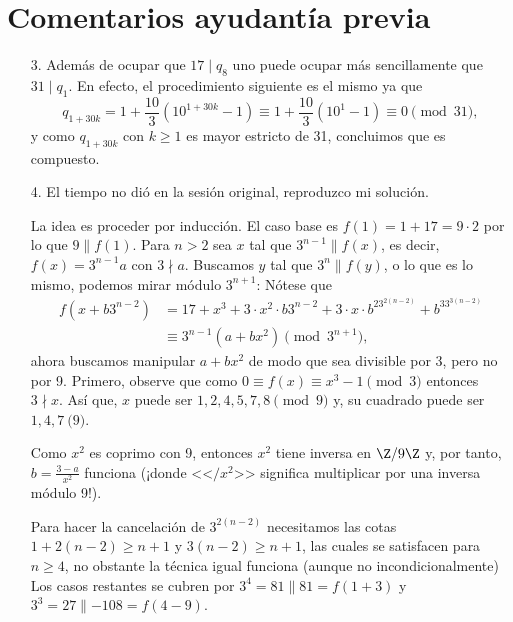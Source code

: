 \documentclass[11pt, reqno]{amsart}
\begin{document}
\section{Comentarios ayudantía previa}
\begin{enumerate}
	\item[3.] Además de ocupar que $17 \mid q_8$ uno puede ocupar más sencillamente que $31 \mid q_1$.
		En efecto, el procedimiento siguiente es el mismo ya que
		$$ q_{1 + 30k} = 1 + \frac{10}{3}(10^{1 + 30k} - 1) \equiv 1 + \frac{10}{3}(10^1 - 1) \equiv 0 \pmod{31}, $$
		y como $q_{1 + 30k}$ con $k \ge 1$ es mayor estricto de 31, concluimos que es compuesto.

	\item[4.] El tiempo no dió en la sesión original, reproduzco mi solución.

		\newcommand{\mmid}{\parallel}
		La idea es proceder por inducción.
		El caso base es $f(1) = 1 + 17 = 9\cdot 2$ por lo que $9 \mmid f(1)$.
		Para $n > 2$ sea $x$ tal que $3^{n-1} \mmid f(x)$, es decir, $f(x) = 3^{n-1}a$ con $3 \nmid a$.
		Buscamos $y$ tal que $3^n \mmid f(y)$, o lo que es lo mismo, podemos mirar módulo $3^{n+1}$:
		Nótese que
		\begin{align*}
			f(x + b3^{n-2}) &= 17 + x^3 + 3 \cdot x^2 \cdot b3^{n-2} + 3 \cdot x \cdot b^23^{2(n-2)} + b^33^{3(n-2)} \\
					&\equiv 3^{n-1}(a + bx^2) \pmod{3^{n+1}},
		\end{align*}
		ahora buscamos manipular $a + bx^2$ de modo que sea divisible por 3, pero no por 9.
		Primero, observe que como $0 \equiv f(x) \equiv x^3 - 1 \pmod{3}$ entonces $3 \nmid x$.
		Así que, $x$ puede ser $1, 2, 4, 5, 7, 8 \pmod 9$ y, su cuadrado puede ser $1, 4, 7 \pod 9$.

		Como $x^2$ es coprimo con 9, entonces $x^2$ tiene inversa en $\Z/9\Z$ y, por tanto, $b = \frac{3 - a}{x^2}$ funciona
		(¡donde <<$/x^2$>> significa multiplicar por una inversa módulo 9!).

		Para hacer la cancelación de $3^{2(n - 2)}$ necesitamos las cotas $1 + 2(n - 2) \ge n + 1$ y $3(n - 2) \ge n + 1$,
		las cuales se satisfacen para $n \ge 4$, no obstante la técnica igual funciona (aunque no incondicionalmente)
		Los casos restantes se cubren por $3^4 = 81 \mmid 81 = f(1 + 3)$ y $3^3 = 27 \mmid -108 = f(4 - 9)$.
\end{enumerate}

\nocite{hua:number}
\printbibliography[title={Referencias y lecturas adicionales}]
\end{document}
